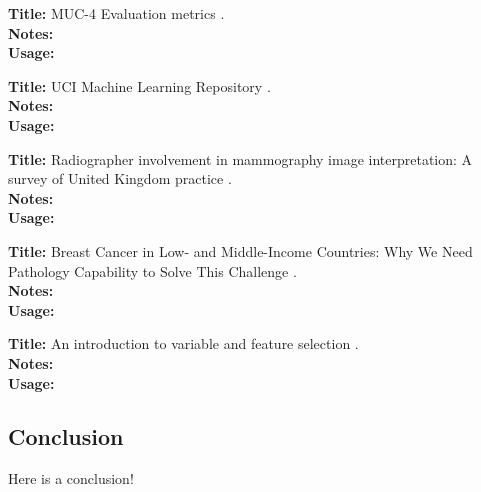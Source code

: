 \documentclass[a4paper]{article}
\begin{document}
\noindent
\textbf{Title:} MUC-4 Evaluation metrics \cite{muc1992}.
\\
\textbf{Notes:}
\\
\textbf{Usage:}
\\\par

\noindent
\textbf{Title:} {UCI} Machine Learning Repository \cite{dua:2017}.
\\
\textbf{Notes:}
\\
\textbf{Usage:}
\\\par

\noindent
\textbf{Title:} Radiographer involvement in mammography image interpretation: A survey of United Kingdom practice \cite{culpan2016}.
\\
\textbf{Notes:}
\\
\textbf{Usage:}
\\\par

\noindent
\textbf{Title:} Breast Cancer in Low- and Middle-Income Countries: Why We Need Pathology Capability to Solve This Challenge \cite{martei2018}.
\\
\textbf{Notes:}
\\
\textbf{Usage:}
\\\par

\noindent 
\textbf{Title:} An introduction to variable and feature selection \cite{guyon2003}.
\\
\textbf{Notes:}
\\
\textbf{Usage:}
\\\par

\subsection{Conclusion}

Here is a conclusion!



\end{document}
